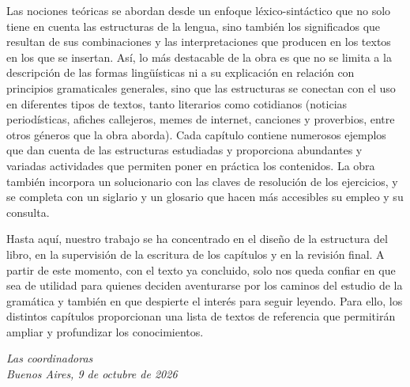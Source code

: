 Las nociones teóricas se abordan desde un enfoque léxico-sintáctico que no solo
tiene en cuenta las estructuras de la lengua, sino también los significados que
resultan de sus combinaciones y las interpretaciones que producen en los textos
en los que se insertan. Así, lo más destacable de la obra es que no se limita a
la descripción de las formas lingüísticas ni a su explicación en relación con
principios gramaticales generales, sino que las estructuras se conectan con el
uso en diferentes tipos de textos, tanto literarios como cotidianos (noticias
periodísticas, afiches callejeros, memes de internet, canciones y proverbios,
entre otros géneros que la obra aborda). Cada capítulo contiene numerosos
ejemplos que dan cuenta de las estructuras estudiadas y proporciona abundantes y
variadas actividades que permiten poner en práctica los contenidos. La obra
también incorpora un solucionario con las claves de resolución de los
ejercicios, y se completa con un siglario y un glosario que hacen más accesibles
su empleo y su consulta.

Hasta aquí, nuestro trabajo se ha concentrado en el diseño de la estructura del
libro, en la supervisión de la escritura de los capítulos y en la revisión
final. A partir de este momento, con el texto ya concluido, solo nos queda
confiar en que sea de utilidad para quienes deciden aventurarse por los caminos
del estudio de la gramática y también en que despierte el interés para seguir
leyendo. Para ello, los distintos capítulos proporcionan una lista de textos de
referencia que permitirán ampliar y profundizar los conocimientos.

\bigskip
\begin{flushright}
  \itshape Las coordinadoras\\
  \upshape Buenos Aires, 9 de octubre de 2026
\end{flushright}
